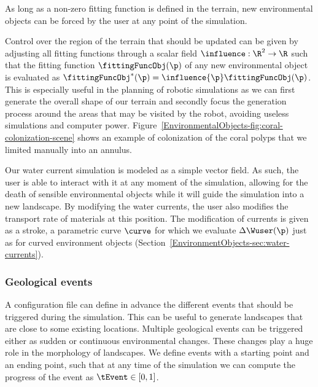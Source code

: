 As long as a non-zero fitting function is defined in the terrain, new environmental objects can be forced by the user at any point of the simulation. 

Control over the region of the terrain that should be updated can be given by adjusting all fitting functions through a scalar field $\influence: \R^2 \to \R $ such that the fitting function $\fittingFuncObj(\p)$ of any new environmental object is evaluated as $\fittingFuncObj^*(\p) = \influence{\p} \fittingFuncObj(\p)$. This is especially useful in the planning of robotic simulations as we can first generate the overall shape of our terrain and secondly focus the generation process around the areas that may be visited by the robot, avoiding useless simulations and computer power. 
Figure~\ref{EnvironmentalObjects-fig:coral-colonization-scene} shows an example of colonization of the coral polyps that we limited manually into an annulus.


Our water current simulation is modeled as a simple vector field. As such, the user is able to interact with it at any moment of the simulation, allowing for the death of sensible environmental objects while it will guide the simulation into a new landscape. By modifying the water currents, the user also modifies the transport rate of materials at this position. The modification of currents is given as a stroke, a parametric curve $\curve$ for which we evaluate $\Delta \Wuser(\p)$ just as for curved environment objects (Section~\ref{EnvironmentObjects-sec:water-currents}).

\subsubsection{Geological events}
\label{EnvironmentObjects-sec:events}
A configuration file can define in advance the different events that should be triggered during the simulation. This can be useful to generate landscapes that are close to some existing locations. 
Multiple geological events can be triggered either as sudden or continuous environmental changes. These changes play a huge role in the morphology of landscapes.
We define events with a starting point and an ending point, such that at any time of the simulation we can compute the progress of the event as $\tEvent \in [0, 1]$.

